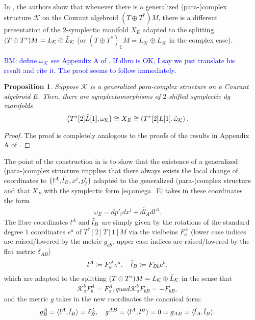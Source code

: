 \documentclass[letterpaper,12pt]{article}
\newcommand{\TT}{{T\oplus T^*}}
\newcommand{\KK}{\mathcal{K}}
\newcommand{\la}{\langle}
\newcommand{\ra}{\rangle}
\def\tl{\tilde}
\newtheorem{proposition}[theorem]{Proposition}
\theoremstyle{definition}
\theoremstyle{remark}
\theoremstyle{examples}
\def\brian{\textcolor{blue}{BM: }\textcolor{blue}}
\begin{document}
In \cite{Cattaneo:2009zx}, the authors show that whenever there is a  generalized (para-)complex structure $\KK$ on the Courant algebroid $(\TT)M$, there is a different presentation of the $2$-symplectic manifold $X_E$ adapted to the splitting $(\TT)M=L_{\KK}\oplus \Tilde{L}_{\KK}$ (or $(\TT)_\mathbb{C}M=L_{\KK}\oplus \overline{L}_{\KK}$ in the complex case).

\brian{define $\omega_{\KK}$ see Appendix A of \cite{Cattaneo:2009zx}. 
If dbro is OK, I say we just translate his result and cite it. The proof seems to follow immediately.}
\begin{proposition}\label{prop: symp}
Suppose $\KK$ is a generalized para-complex structure on a Courant algebroid $E$.
Then, there are symplectomorphisms of $2$-shifted symplectic dg manifolds
\[
\left(T^*[2] \Tilde{L}[1], \omega_{\KK} \right) \cong X_E \cong \left(T^*[2] {L}[1], \Tilde{\omega}_{\KK} \right) .
\]
\end{proposition}
\begin{proof}
The proof is completely analogous to the proofs of the results in Appendix A of \cite{Cattaneo:2009zx}.
\end{proof}
The point of the construction in \cite{Cattaneo:2009zx} is to show that the existence of a generalized (para-)complex structure impplies that there always exists the local change of coordinates to $\{l^A, \Tilde{l}_B, x^i, p'_j\}$ adapted to the generalized (para-)complex structure and that $X_E$ with the symplectic form \eqref{eq:omega_E} takes in these coordinates the form
\begin{align*}
\omega_E=dp'_i dx^i+d\tl{l}_Adl^A.
\end{align*}
The fibre coordinates $l^A$ and $\Tilde{l}_B$ are simply given by the rotations of the standard degree $1$ coordinates $e^a$ of $T^*[2]T[1]M$ via the vielbeins $F^A_a$ (lower case indices are raised/lowered by the metric $g_{ab}$, upper case indices are raised/lowered by the flat metric $\delta_{AB}$)
\begin{align*}
l^A\coloneqq F^A_ae^a, \quad \Tilde{l}_B\coloneqq F_{Bb}e^b,
\end{align*}
which are adapted to the splitting $(\TT)M=L_{\KK}\oplus \Tilde{L}_{\KK}$ in the sense that
\begin{align*}
\KK_a^b F^A_b=F^A_a, quad \KK_a^b F_{bB}=-F_{bB},
\end{align*}
and the metric $g$ takes in the new coordinates the canonical form:
\begin{align*}
g^A_B=\la l^A,\Tilde{l}_B\ra = \delta^A_B, \quad g^{AB}=\la l^A,l^B\ra=0=g_{AB}=\la \Tilde{l}_A,\Tilde{l}_B\ra.
\end{align*}
\end{document}
